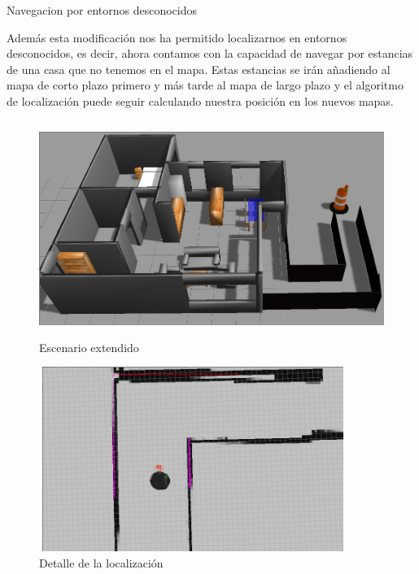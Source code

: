 {Navegacion por entornos desconocidos}

Además esta modificación nos ha permitido localizarnos en entornos desconocidos, es decir, ahora contamos con la capacidad de navegar por estancias de una casa que no tenemos en el mapa. Estas estancias se irán añadiendo al mapa de corto plazo primero y más tarde al mapa de largo plazo y el algoritmo de localización puede seguir calculando nuestra posición en los nuevos mapas.

\begin{figure}[hbtp]
  \begin{center}
    \includegraphics[width=12cm,height=7cm]{img/cap7/grannieAnne-ext}
  \end{center}
  \caption{Escenario extendido}
  \label{fig:grannieAnne-ext}
\end{figure}

\begin{figure}[hbtp]
  \begin{center}
    \includegraphics[width=10cm,height=6cm]{img/cap7/localization-ext}
  \end{center}
  \caption{Detalle de la localización}
  \label{fig:localization-ext}
\end{figure}


